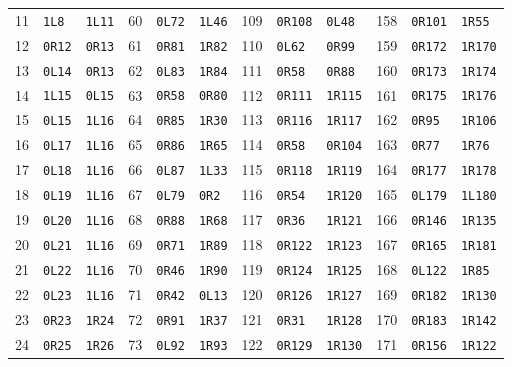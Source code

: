 \begin{center}
\begin{tabular}{rll@{\qquad}rll@{\qquad}rll@{\qquad}rll}
11 & \texttt{1L8} & \texttt{1L11} & 60 & \texttt{0L72} & \texttt{1L46} & 109 & \texttt{0R108} & \texttt{0L48} & 158 & \texttt{0R101} & \texttt{1R55}\\
12 & \texttt{0R12} & \texttt{0R13} & 61 & \texttt{0R81} & \texttt{1R82} & 110 & \texttt{0L62} & \texttt{0R99} & 159 & \texttt{0R172} & \texttt{1R170}\\
13 & \texttt{0L14} & \texttt{0R13} & 62 & \texttt{0L83} & \texttt{1R84} & 111 & \texttt{0R58} & \texttt{0R88} & 160 & \texttt{0R173} & \texttt{1R174}\\
14 & \texttt{1L15} & \texttt{0L15} & 63 & \texttt{0R58} & \texttt{0R80} & 112 & \texttt{0R111} & \texttt{1R115} & 161 & \texttt{0R175} & \texttt{1R176}\\
15 & \texttt{0L15} & \texttt{1L16} & 64 & \texttt{0R85} & \texttt{1R30} & 113 & \texttt{0R116} & \texttt{1R117} & 162 & \texttt{0R95} & \texttt{1R106}\\
16 & \texttt{0L17} & \texttt{1L16} & 65 & \texttt{0R86} & \texttt{1R65} & 114 & \texttt{0R58} & \texttt{0R104} & 163 & \texttt{0R77} & \texttt{1R76}\\
17 & \texttt{0L18} & \texttt{1L16} & 66 & \texttt{0L87} & \texttt{1L33} & 115 & \texttt{0R118} & \texttt{1R119} & 164 & \texttt{0R177} & \texttt{1R178}\\
18 & \texttt{0L19} & \texttt{1L16} & 67 & \texttt{0L79} & \texttt{0R2} & 116 & \texttt{0R54} & \texttt{1R120} & 165 & \texttt{0L179} & \texttt{1L180}\\
19 & \texttt{0L20} & \texttt{1L16} & 68 & \texttt{0R88} & \texttt{1R68} & 117 & \texttt{0R36} & \texttt{1R121} & 166 & \texttt{0R146} & \texttt{1R135}\\
20 & \texttt{0L21} & \texttt{1L16} & 69 & \texttt{0R71} & \texttt{1R89} & 118 & \texttt{0R122} & \texttt{1R123} & 167 & \texttt{0R165} & \texttt{1R181}\\
21 & \texttt{0L22} & \texttt{1L16} & 70 & \texttt{0R46} & \texttt{1R90} & 119 & \texttt{0R124} & \texttt{1R125} & 168 & \texttt{0L122} & \texttt{1R85}\\
22 & \texttt{0L23} & \texttt{1L16} & 71 & \texttt{0R42} & \texttt{0L13} & 120 & \texttt{0R126} & \texttt{1R127} & 169 & \texttt{0R182} & \texttt{1R130}\\
23 & \texttt{0R23} & \texttt{1R24} & 72 & \texttt{0R91} & \texttt{1R37} & 121 & \texttt{0R31} & \texttt{1R128} & 170 & \texttt{0R183} & \texttt{1R142}\\
24 & \texttt{0R25} & \texttt{1R26} & 73 & \texttt{0L92} & \texttt{1R93} & 122 & \texttt{0R129} & \texttt{1R130} & 171 & \texttt{0R156} & \texttt{1R122}\\

\end{tabular}
\end{center}
